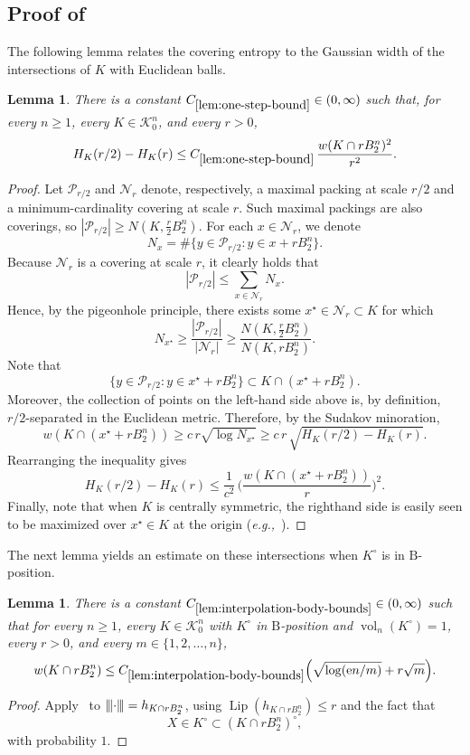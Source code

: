 \documentclass[11pt]{amsart}
\newcommand{\Vol}{\operatorname{vol}}
\newcommand{\Lip}{\operatorname{Lip}}
\newcommand{\1}{\mathbf 1}
\newcommand{\vertiii}[1]{{\left\vert\kern-0.25ex\left\vert\kern-0.25ex\left\vert #1 
\right\vert\kern-0.25ex\right\vert\kern-0.25ex\right\vert}}
\newcommand{\gauge}[1]{\vertiii{#1}}
\newcommand{\e}{\mathrm{e}}
\newcommand{\eg}{\emph{e.g.,}}
\newcommand{\Bodies}{\mathcal{K}_0^n}
\newcommand{\Bobkov}{\mathrm{B}}
\let\vol\Vol
\theoremstyle{plain}
\newtheorem{lemma}[theorem]{Lemma}
\begin{document}
\subsection{Proof of~\texorpdfstring{}{the metric-entropy theorem}}

The following lemma relates the covering entropy to the Gaussian width of the intersections of $K$ with Euclidean balls.

\begin{lemma}
\label{lem:one-step-bound}
There is a constant $C_{\ref{lem:one-step-bound}} \in (0, \infty)$ such that, for every $n \geq 1$, every $K \in \Bodies$, and every $r > 0$,
\[
H_K(r/2) - H_K(r) \leq C_{\ref{lem:one-step-bound}} \,
\frac{w(K \cap rB^n_2)^2}{r^2}.
\]
\end{lemma}
\begin{proof}
Let $\mathcal{P}_{r/2}$ and $\mathcal{N}_r$ denote, respectively, a maximal packing at scale $r/2$ and a minimum-cardinality covering at scale $r$. Such maximal packings are also coverings, so $|\mathcal{P}_{r/2}| \geq N(K, \tfrac{r}{2} B^n_2)$. For each $x \in \mathcal{N}_{r}$, we denote
\[
N_x = \#\{y \in \mathcal{P}_{r/2} : y \in x + rB^n_2\}.
\]
Because $\mathcal{N}_r$ is a covering at scale $r$, it clearly holds that 
\[
|\mathcal{P}_{r/2}| \leq \sum_{x \in \mathcal{N}_r} N_x.
\]
Hence, by the pigeonhole principle, there exists some $x^\star \in \mathcal{N}_r \subset K$ for which
\[
N_{x^\star} \geq \frac{|\mathcal{P}_{r/2}|}{|\mathcal{N}_r|} \geq \frac{N(K, \tfrac{r}{2} B^n_2)}{N(K, r B^n_2)}.
\]
Note that 
\[
\{y \in \mathcal{P}_{r/2} : y \in x^\star + r B^n_2\} \subset K \cap (x^\star+ rB^n_2).
\]
Moreover, the collection of points on the left-hand side above is, by definition, $r/2$-separated in the Euclidean metric. Therefore, by the Sudakov minoration,
\[
w(K \cap (x^\star + rB^n_2)) \geq c  \, r \sqrt{\log N_{x^\star}} 
\geq c\, r \, \sqrt{H_K(r/2) - H_K(r)}. 
\]
Rearranging the inequality gives
\[
H_K(r/2) - H_K(r) \leq \frac{1}{c^2} \, \Big(\frac{w(K \cap(x^\star + r B^n_2))}{r}\Big)^2.
\]
Finally, note that when $K$ is centrally symmetric, the righthand side is easily seen to be maximized over $x^\star \in K$ at the origin (\eg~\cite[Lemma 8.2]{Mou25}).
\end{proof}

The next lemma yields an estimate on these intersections when $K^\circ$ is in $\Bobkov$-position.
\begin{lemma}
\label{lem:interpolation-body-bounds}
There is a constant $C_{\ref{lem:interpolation-body-bounds}} \in (0, \infty)$ such that for every $n\geq 1$,
every $K\in \Bodies$ with $K^\circ$ in $\Bobkov$-position and $\vol_n(K^\circ) = 1$,
every $r > 0$, and every $m \in \{1, 2, \dots, n\}$,
\[
w(K \cap r B^n_2) \leq C_{\ref{lem:interpolation-body-bounds}}
\Big(\sqrt{\log(\e n/m)} + r \sqrt{m} \Big).
\]
\end{lemma}
\begin{proof}
Apply~ to $\gauge{\cdot} = h_{K \cap r B^n_2}$, using $\Lip(h_{K \cap r B^n_2}) \leq r$ and the fact that \[
X \in K^\circ \subset (K \cap r B^n_2)^\circ,
\]with probability $1$.
\end{proof}
\end{document}
